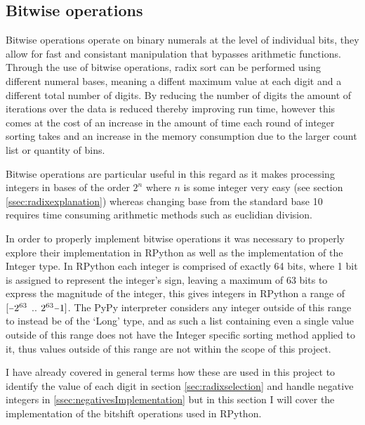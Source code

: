 \documentclass[12pt]{article}
\newcommand{\minus}{\scalebox{0.75}[1.0]{$-$}}
\begin{document}
\subsection{Bitwise operations}
\label{ssec:bitwise}
Bitwise operations operate on binary numerals at the level of individual bits, they allow for fast and consistant manipulation that bypasses arithmetic functions. Through the use of bitwise operations, radix sort can be performed using different numeral bases, meaning a diffent maximum value at each digit and a different total number of digits. By reducing the number of digits the amount of iterations over the data is reduced thereby improving run time, however this comes at the cost of an increase in the amount of time each round of integer sorting takes and an increase in the memory consumption due to the larger count list or quantity of bins. 
\par
Bitwise operations are particular useful in this regard as it makes processing integers in bases of the order $2^n$ where $n$ is some integer very easy (see section \ref{ssec:radixexplanation}) whereas changing base from the standard base 10 requires time consuming arithmetic methods such as euclidian division.
\par
In order to properly implement bitwise operations it was necessary to properly explore their implementation in RPython as well as the implementation of the Integer type. In RPython each integer is comprised of exactly 64 bits, where 1 bit is assigned to represent the integer's sign, leaving a maximum of 63 bits to express the magnitude of the integer, this gives integers in RPython a range of $[\minus2^{63}$ $..$ $2^{63}\minus1]$. The PyPy interpreter considers any integer outside of this range to instead be of the `Long' type, and as such a list containing even a single value outside of this range does not have the Integer specific sorting method applied to it, thus values outside of this range are not within the scope of this project.
\par
I have already covered in general terms how these  are used in this project to identify the value of each digit in section \ref{sec:radixselection} and handle negative integers in \ref{ssec:negativesImplementation} but in this section I will cover the implementation of the bitshift operations used in RPython.
\par

\pagebreak
\end{document}
